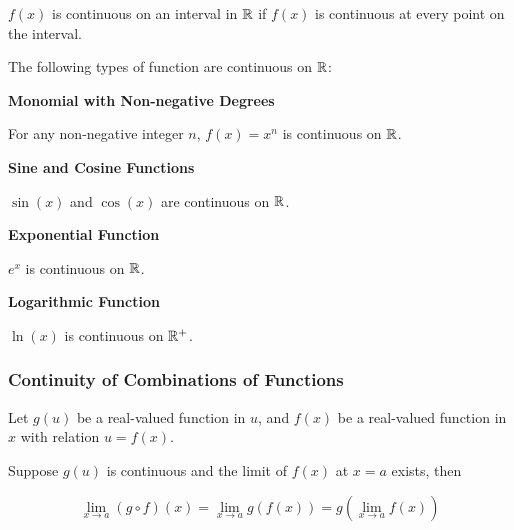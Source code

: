 \documentclass[a4paper,12pt]{article}
\begin{document}
$f(x)$ is continuous on an interval in $\mathbb{R}$ if $f(x)$ is continuous at every point on the interval.\n

\begin{pst}
  The following types of function are continuous on $\mathbb{R}$:

  \begin{alist}
    \item \textbf{Monomial with Non-negative Degrees}\n

    For any non-negative integer $n$, $f(x)=x^{n}$ is continuous on $\mathbb{R}$.

    \item \textbf{Sine and Cosine Functions}\n

    $\sin(x)$ and $\cos(x)$ are continuous on $\mathbb{R}$.

    \item \textbf{Exponential Function}\n

    $e^{x}$ is continuous on $\mathbb{R}$.

    \item \textbf{Logarithmic Function}\n

    $\ln(x)$ is continuous on $\mathbb{R}^{+}$.
  \end{alist}
\end{pst}

\subsubsection{Continuity of Combinations of Functions}
\begin{thm}
  Let $g(u)$ be a real-valued function in $u$, and $f(x)$ be a real-valued function in $x$ with relation $u=f(x)$.\n

  Suppose $g(u)$ is continuous and the limit of $f(x)$ at $x=a$ exists, then

  $$\lim_{x\to a}(g\circ f)(x)=\lim_{x\to a}g(f(x))=g(\lim_{x\to a}f(x))$$
\end{thm}\n
\end{document}
